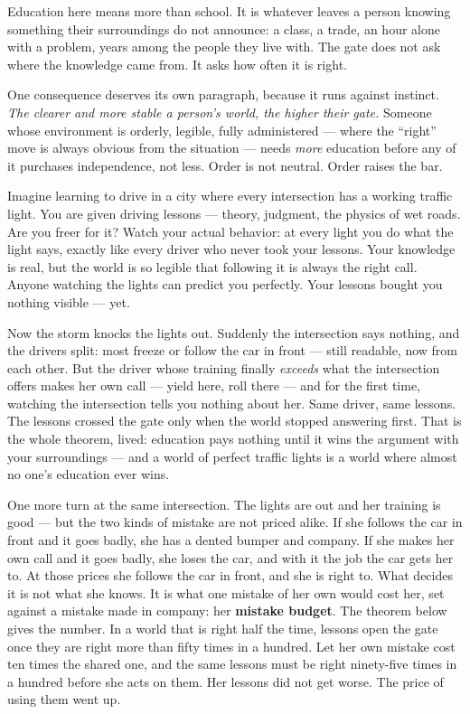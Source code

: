 Education here means more than school. It is whatever leaves a person
knowing something their surroundings do not announce: a class, a
trade, an hour alone with a problem, years among the people they live
with. The gate does not ask where the knowledge came from. It asks how
often it is right.

One consequence deserves its own paragraph, because it runs against
instinct. \emph{The clearer and more stable a person's world, the higher
their gate.} Someone whose environment is orderly, legible, fully
administered --- where the ``right'' move is always obvious from the
situation --- needs \emph{more} education before any of it purchases
independence, not less. Order is not neutral. Order raises the bar.


Imagine learning to drive in a city where every intersection has a
working traffic light. You are given driving lessons --- theory, judgment,
the physics of wet roads. Are you freer for it? Watch your actual
behavior: at every light you do what the light says, exactly like every
driver who never took your lessons. Your knowledge is real, but the
world is so legible that following it is always the right call. Anyone
watching the lights can predict you perfectly. Your lessons bought you
nothing visible --- yet.


Now the storm knocks the lights out. Suddenly the intersection says
nothing, and the drivers split: most freeze or follow the car in front ---
still readable, now from each other. But the driver whose training
finally \emph{exceeds} what the intersection offers makes her own call ---
yield here, roll there --- and for the first time, watching the
intersection tells you nothing about her. Same driver, same lessons.
The lessons crossed the gate only when the world stopped answering
first. That is the whole theorem, lived: education pays nothing until
it wins the argument with your surroundings --- and a world of perfect
traffic lights is a world where almost no one's education ever wins.

One more turn at the same intersection. The lights are out and her
training is good --- but the two kinds of mistake are not priced alike.
If she follows the car in front and it goes badly, she has a dented
bumper and company. If she makes her own call and it goes badly, she
loses the car, and with it the job the car gets her to. At those
prices she follows the car in front, and she is right to. What decides
it is not what she knows. It is what one mistake of her own would cost
her, set against a mistake made in company: her \textbf{mistake budget}.
The theorem below gives the number. In a world that is right half the
time, lessons open the gate once they are right more than fifty times
in a hundred. Let her own mistake cost ten times the shared one, and
the same lessons must be right ninety-five times in a hundred before
she acts on them. Her lessons did not get worse. The price of using
them went up.

